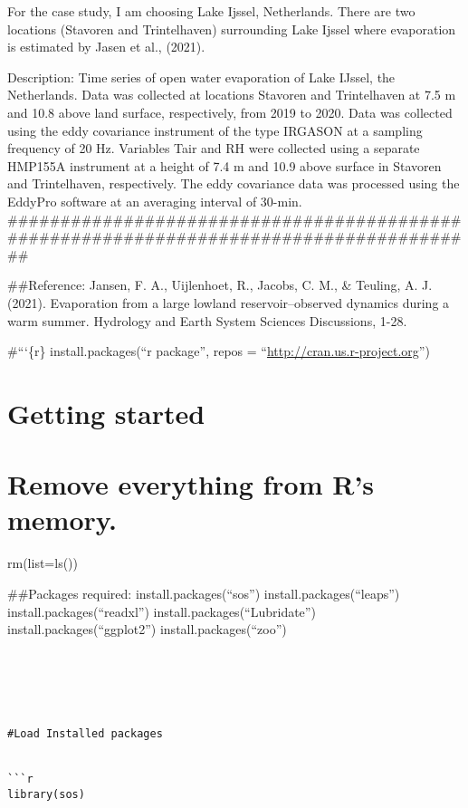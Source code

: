 \documentclass[
]{article}
\begin{document}
For the case study, I am choosing Lake Ijssel, Netherlands. There are
two locations (Stavoren and Trintelhaven) surrounding Lake Ijssel where
evaporation is estimated by Jasen et al., (2021).

Description: Time series of open water evaporation of Lake IJssel, the
Netherlands. Data was collected at locations Stavoren and Trintelhaven
at 7.5 m and 10.8 above land surface, respectively, from 2019 to 2020.
Data was collected using the eddy covariance instrument of the type
IRGASON at a sampling frequency of 20 Hz. Variables Tair and RH were
collected using a separate HMP155A instrument at a height of 7.4 m and
10.9 above surface in Stavoren and Trintelhaven, respectively. The eddy
covariance data was processed using the EddyPro software at an averaging
interval of 30-min.
\#\#\#\#\#\#\#\#\#\#\#\#\#\#\#\#\#\#\#\#\#\#\#\#\#\#\#\#\#\#\#\#\#\#\#\#\#\#\#\#\#\#\#\#\#\#\#\#\#\#\#\#\#\#\#\#\#\#\#\#\#\#\#\#\#\#\#\#\#\#\#\#\#\#\#\#\#\#\#\#\#\#\#\#\#\#\#\#

\#\#Reference: Jansen, F. A., Uijlenhoet, R., Jacobs, C. M., \& Teuling,
A. J. (2021). Evaporation from a large lowland reservoir--observed
dynamics during a warm summer. Hydrology and Earth System Sciences
Discussions, 1-28.

\#```\{r\} install.packages(``r package'', repos =
``\url{http://cran.us.r-project.org}'')

\hypertarget{getting-started}{%
\section{Getting started}\label{getting-started}}

\hypertarget{remove-everything-from-rs-memory.}{%
\section{Remove everything from R's
memory.}\label{remove-everything-from-rs-memory.}}

rm(list=ls())

\#\#Packages required: install.packages(``sos'')
install.packages(``leaps'') install.packages(``readxl'')
install.packages(``Lubridate'') install.packages(``ggplot2'')
install.packages(``zoo'')

\begin{verbatim}





#Load Installed packages


```r
library(sos)
\end{verbatim}
\end{document}
